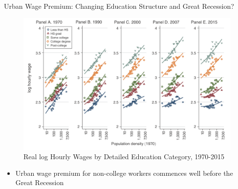 \documentclass{beamer}
\begin{document}
\begin{frame}{Urban Wage Premium: Changing Education Structure and Great Recession?}

\begin{figure}
	\begin{center}
		\includegraphics[scale=0.33]{Figures/Fig9_WagePremium_Education}
		\caption{Real log Hourly Wages by Detailed Education Category, 1970-2015}
	\end{center}
\end{figure}

\begin{itemize}
	\vspace{-0.7cm}
	\item Urban wage premium for non-college workers commences well before the Great Recession
	
\end{itemize}

\end{frame}
\end{document}
